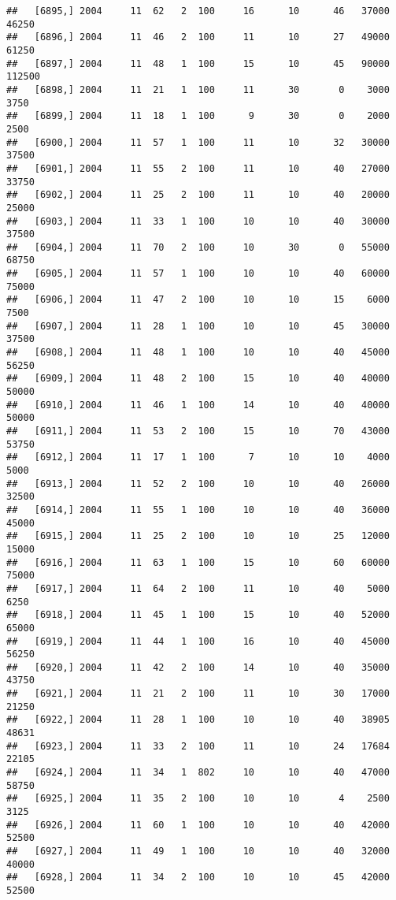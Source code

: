 \documentclass{article}\usepackage[]{graphicx}\usepackage[]{color}
\makeatletter
\newenvironment{kframe}{%
 \def\at@end@of@kframe{}%
 \ifinner\ifhmode%
  \def\at@end@of@kframe{\end{minipage}}%
  \begin{minipage}{\columnwidth}%
 \fi\fi%
 \def\FrameCommand##1{\hskip\@totalleftmargin \hskip-\fboxsep
 \colorbox{shadecolor}{##1}\hskip-\fboxsep
     \hskip-\linewidth \hskip-\@totalleftmargin \hskip\columnwidth}%
 \MakeFramed {\advance\hsize-\width
   \@totalleftmargin\z@ \linewidth\hsize
   \@setminipage}}%
 {\par\unskip\endMakeFramed%
 \at@end@of@kframe}
\newenvironment{knitrout}{}{} %
\makeatother
\begin{document}
\begin{knitrout}
\begin{kframe}
\begin{verbatim}
##   [6895,] 2004     11  62   2  100     16      10      46   37000   46250
##   [6896,] 2004     11  46   2  100     11      10      27   49000   61250
##   [6897,] 2004     11  48   1  100     15      10      45   90000  112500
##   [6898,] 2004     11  21   1  100     11      30       0    3000    3750
##   [6899,] 2004     11  18   1  100      9      30       0    2000    2500
##   [6900,] 2004     11  57   1  100     11      10      32   30000   37500
##   [6901,] 2004     11  55   2  100     11      10      40   27000   33750
##   [6902,] 2004     11  25   2  100     11      10      40   20000   25000
##   [6903,] 2004     11  33   1  100     10      10      40   30000   37500
##   [6904,] 2004     11  70   2  100     10      30       0   55000   68750
##   [6905,] 2004     11  57   1  100     10      10      40   60000   75000
##   [6906,] 2004     11  47   2  100     10      10      15    6000    7500
##   [6907,] 2004     11  28   1  100     10      10      45   30000   37500
##   [6908,] 2004     11  48   1  100     10      10      40   45000   56250
##   [6909,] 2004     11  48   2  100     15      10      40   40000   50000
##   [6910,] 2004     11  46   1  100     14      10      40   40000   50000
##   [6911,] 2004     11  53   2  100     15      10      70   43000   53750
##   [6912,] 2004     11  17   1  100      7      10      10    4000    5000
##   [6913,] 2004     11  52   2  100     10      10      40   26000   32500
##   [6914,] 2004     11  55   1  100     10      10      40   36000   45000
##   [6915,] 2004     11  25   2  100     10      10      25   12000   15000
##   [6916,] 2004     11  63   1  100     15      10      60   60000   75000
##   [6917,] 2004     11  64   2  100     11      10      40    5000    6250
##   [6918,] 2004     11  45   1  100     15      10      40   52000   65000
##   [6919,] 2004     11  44   1  100     16      10      40   45000   56250
##   [6920,] 2004     11  42   2  100     14      10      40   35000   43750
##   [6921,] 2004     11  21   2  100     11      10      30   17000   21250
##   [6922,] 2004     11  28   1  100     10      10      40   38905   48631
##   [6923,] 2004     11  33   2  100     11      10      24   17684   22105
##   [6924,] 2004     11  34   1  802     10      10      40   47000   58750
##   [6925,] 2004     11  35   2  100     10      10       4    2500    3125
##   [6926,] 2004     11  60   1  100     10      10      40   42000   52500
##   [6927,] 2004     11  49   1  100     10      10      40   32000   40000
##   [6928,] 2004     11  34   2  100     10      10      45   42000   52500

\end{verbatim}
\end{kframe}
\end{knitrout}
\end{document}
